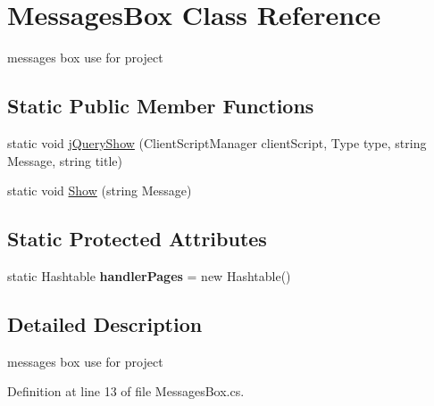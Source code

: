 \hypertarget{class_messages_box}{\section{Messages\-Box Class Reference}
\label{class_messages_box}
}


messages box use for project  


\subsection*{Static Public Member Functions}
\begin{DoxyCompactItemize}
\item 
static void \hyperlink{class_messages_box_a957b15d12e12f117f8cbbc5b5ee081cc}{j\-Query\-Show} (Client\-Script\-Manager client\-Script, Type type, string Message, string title)
\item 
static void \hyperlink{class_messages_box_aa969029449da8c6ac0b1a22e8787ccfd}{Show} (string Message)
\end{DoxyCompactItemize}
\subsection*{Static Protected Attributes}
\begin{DoxyCompactItemize}
\item 
\hypertarget{class_messages_box_a5b4879c57ab2326d66cabc2568585322}{static Hashtable {\bfseries handler\-Pages} = new Hashtable()}\label{class_messages_box_a5b4879c57ab2326d66cabc2568585322}

\end{DoxyCompactItemize}


\subsection{Detailed Description}
messages box use for project 

Definition at line 13 of file Messages\-Box.\-cs.



